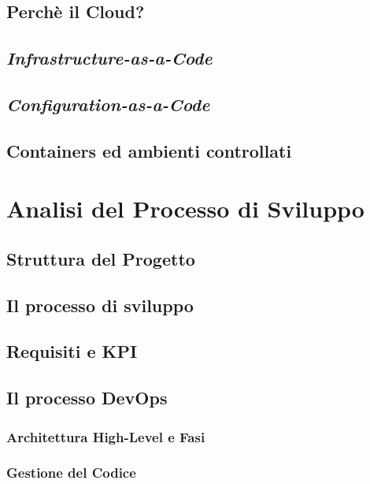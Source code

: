\documentclass[a4paper,12pt]{report}
\begin{document}
	\section{Perchè il Cloud?}
	
	\section{\emph{Infrastructure-as-a-Code}}
	
	\section{\emph{Configuration-as-a-Code}}
	
	\section{Containers ed ambienti controllati}
	
	\chapter{Analisi del Processo di Sviluppo}
	
	\section{Struttura del Progetto}
	
	\section{Il processo di sviluppo}
	
	\section{Requisiti e KPI}
	
	\section{Il processo DevOps}
	
	\subsection{Architettura High-Level e Fasi}
	
	\subsection{Gestione del Codice}
	
\end{document}
